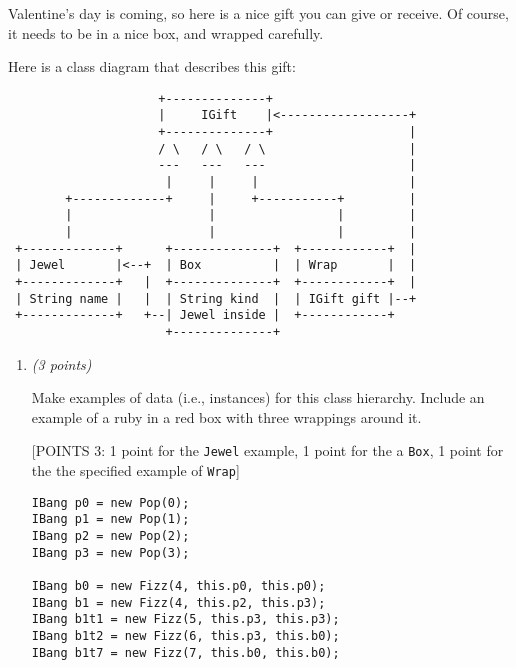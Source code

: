 \documentclass[11pt]{article}
\def\pts#1{\marginpar{\footnotesize \raggedright  \fbox{#1 {\sc Points}}}}
\newcounter{Pctr}
\newenvironment{problem}{\stepcounter{Pctr}%
\begin{description}
\item[\noindent{\bf Problem} \arabic{Pctr}] 
\end{description}}{\relax}
\begin{document}
\vfill\thispagestyle{empty}
\newpage

\pts{34}
\begin{problem}  Valentine's day is coming, so here is a nice gift you
  can give or receive. Of course, it needs to be in a nice box, and
  wrapped carefully.

Here is a class diagram that describes this gift:

\begin{verbatim}
                     +--------------+
                     |     IGift    |<------------------+
                     +--------------+                   |
                     / \   / \   / \                    |
                     ---   ---   ---                    |
                      |     |     |                     |
        +-------------+     |     +-----------+         |
        |                   |                 |         |
        |                   |                 |         |
 +-------------+      +--------------+  +------------+  |
 | Jewel       |<--+  | Box          |  | Wrap       |  |
 +-------------+   |  +--------------+  +------------+  |
 | String name |   |  | String kind  |  | IGift gift |--+ 
 +-------------+   +--| Jewel inside |  +------------+
                      +--------------+ 
\end{verbatim}


\begin{enumerate}


\newpage
\item {\em{(3 points)}}

 Make examples of data (i.e., instances) for this class
    hierarchy. Include an example of a ruby in a red box with three
    wrappings around it.

\begsol{\vspace{0.5in}}
[POINTS 3: 1 point for the \texttt{Jewel} example, 1 point for the a 
\texttt{Box}, 1 point for the the specified example of \texttt{Wrap}] 

\begin{verbatim}
IBang p0 = new Pop(0);
IBang p1 = new Pop(1);
IBang p2 = new Pop(2);
IBang p3 = new Pop(3);
	
IBang b0 = new Fizz(4, this.p0, this.p0);
IBang b1 = new Fizz(4, this.p2, this.p3);
IBang b1t1 = new Fizz(5, this.p3, this.p3);
IBang b1t2 = new Fizz(6, this.p3, this.b0);
IBang b1t7 = new Fizz(7, this.b0, this.b0);
\end{verbatim}
\endsol



\end{enumerate}
\end{problem}
\end{document}
